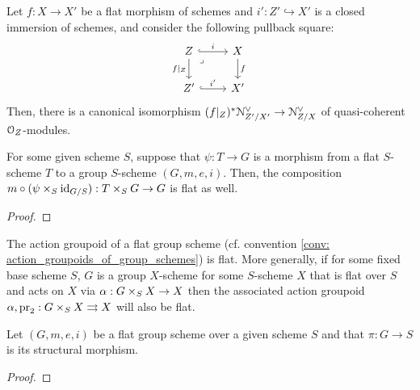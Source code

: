             \begin{corollary} \label{coro: flat_base_changes_of_conormal_sheaves}
                Let $f: X \to X'$ be a flat morphism of schemes and $i': Z' \hookrightarrow X'$ is a closed immersion of schemes, and consider the following pullback square:
                    $$
                        \begin{tikzcd}
                        	Z & X \\
                        	{Z'} & {X'}
                        	\arrow["{f|_Z}"', from=1-1, to=2-1]
                        	\arrow["{i'}", hook, from=2-1, to=2-2]
                        	\arrow["f", from=1-2, to=2-2]
                        	\arrow["i", hook, from=1-1, to=1-2]
                        	\arrow["\lrcorner"{anchor=center, pos=0.125}, draw=none, from=1-1, to=2-2]
                        \end{tikzcd}
                    $$
                Then, there is a canonical isomorphism $(f|_Z)^* \mathcal{N}_{Z'/X'}^{\vee} \to \mathcal{N}_{Z/X}^{\vee}$ of quasi-coherent $\mathcal{O}_Z$-modules. 
            \end{corollary}
            \begin{lemma} \label{lemma: flatness_criterion_for_action_groupoids_of_group_schemes}
                For some given scheme $S$, suppose that $\psi: T \to G$ is a morphism from a flat $S$-scheme $T$ to a group $S$-scheme $(G, m, e, i)$. Then, the composition $m \circ (\psi \x_S \id_{G/S}): T \x_S G \to G$ is flat as well.
            \end{lemma}
                \begin{proof}
                    
                \end{proof}
            \begin{corollary}
                The action groupoid of a flat group scheme (cf. convention \ref{conv: action_groupoids_of_group_schemes}) is flat. More generally, if for some fixed base scheme $S$, $G$ is a group $X$-scheme for some $S$-scheme $X$ that is flat over $S$ and acts on $X$ via $\alpha: G \x_S X \to X$ then the associated action groupoid $\alpha, \pr_2: G \x_S X \toto X$ will also be flat.
            \end{corollary}
            \begin{proposition} \label{prop: differential_forms_on_group_schemes}
                Let $(G, m, e, i)$ be a flat group scheme over a given scheme $S$ and that $\pi: G \to S$ is its structural morphism. 
            \end{proposition}
                \begin{proof}
                    
                \end{proof}
        
